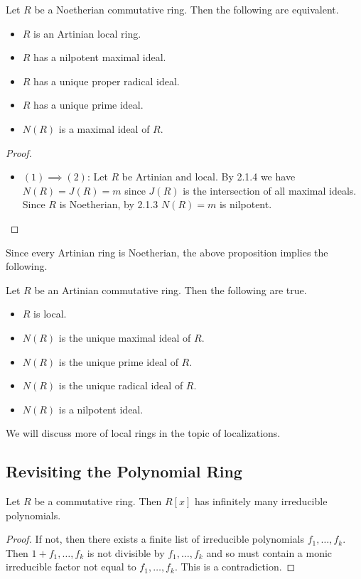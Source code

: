 \documentclass[a4paper]{article}
\begin{document}
\begin{prp}{}{} Let $R$ be a Noetherian commutative ring. Then the following are equivalent. 
\begin{itemize}
\item $R$ is an Artinian local ring. 
\item $R$ has a nilpotent maximal ideal. 
\item $R$ has a unique proper radical ideal. 
\item $R$ has a unique prime ideal. 
\item $N(R)$ is a maximal ideal of $R$. 
\end{itemize} 
\begin{proof}~\\
\begin{itemize}
\item $(1)\implies(2)$: Let $R$ be Artinian and local. By 2.1.4 we have $N(R)=J(R)=m$ since $J(R)$ is the intersection of all maximal ideals. Since $R$ is Noetherian, by 2.1.3 $N(R)=m$ is nilpotent. 
\end{itemize}
\end{proof}
\end{prp}

Since every Artinian ring is Noetherian, the above proposition implies the following. 

\begin{crl}{}{} Let $R$ be an Artinian commutative ring. Then the following are true. 
\begin{itemize}
\item $R$ is local. 
\item $N(R)$ is the unique maximal ideal of $R$. 
\item $N(R)$ is the unique prime ideal of $R$. 
\item $N(R)$ is the unique radical ideal of $R$. 
\item $N(R)$ is a nilpotent ideal. 
\end{itemize}
\end{crl}

We will discuss more of local rings in the topic of localizations. 

\subsection{Revisiting the Polynomial Ring}
\begin{lmm}{}{} Let $R$ be a commutative ring. Then $R[x]$ has infinitely many irreducible polynomials. 
\begin{proof}
If not, then there exists a finite list of irreducible polynomials $f_1,\dots,f_k$. Then $1+f_1,\dots,f_k$ is not divisible by $f_1,\dots,f_k$ and so must contain a monic irreducible factor not equal to $f_1,\dots,f_k$. This is a contradiction. 
\end{proof}
\end{lmm}
\end{document}
